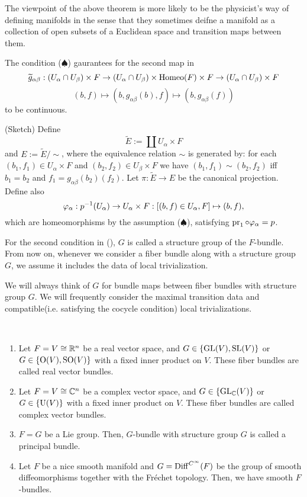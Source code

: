 \documentclass{../../../small}
\begin{document}
The viewpoint of the above theorem is more likely to be the physicist's way of defining manifolds in the sense that they sometimes deifne a manifold as a collection of open subsets of a Euclidean space and transition maps between them.

The condition ($\spadesuit$) gaurantees for the second map in
\[\widetilde g_{\alpha\beta}:(U_\alpha\cap U_\beta)\times F\to(U_\alpha\cap U_\beta)\times\operatorname{Homeo}(F)\times F\to(U_\alpha\cap U_\beta)\times F\]
\[(b,f)\mapsto(b,g_{\alpha\beta}(b),f)\mapsto(b,g_{\alpha\beta}(f))\]
to be continuous.

\begin{pf}(Sketch)
Define
\[\tilde E:=\coprod U_\alpha\times F\]
and $E:=\tilde E/\sim$, where the equivalence relation $\sim$ is generated by: for each $(b_1,f_1)\in U_\alpha\times F$ and $(b_2,f_2)\in U_\beta\times F$ we have $(b_1,f_1)\sim(b_2,f_2)$ iff $b_1=b_2$ and $f_1=g_{\alpha\beta}(b_2)(f_2)$.
Let $\pi:\tilde E\to E$ be the canonical projection.
Define also
\[\varphi_\alpha:p^{-1}(U_\alpha)\to U_\alpha\times F:[(b,f)\in U_\alpha,F]\mapsto (b,f),\] which are homeomorphisms by the assumption ($\spadesuit$), satisfying $\operatorname{pr}_1\circ\varphi_\alpha=p$.
\end{pf}

For the second condition in (\spadesuit), $G$ is called a structure group of the $F$-bundle.
From now on, whenever we consider a fiber bundle along with a structure group $G$, we assume it includes the data of local trivialization.

\begin{rmk*}
We will always think of $G$ for bundle maps between fiber bundles with structure group $G$.
We will frequently consider the maximal transition data and compatible(i.e. satisfying the cocycle condition) local trivializations.
\end{rmk*}
\begin{ex*}\,
\begin{enumerate}
\item Let $F=V\cong\mathbb{R}^n$ be a real vector space, and $G\in\{\mathrm{GL}(V),\mathrm{SL}(V)\}$ or $G\in\{\mathrm{O}(V),\mathrm{SO}(V)\}$ with a fixed inner product on $V$. These fiber bundles are called real vector bundles.
\item Let $F=V\cong\mathbb{C}^n$ be a complex vector space, and $G\in\{\mathrm{GL}_{\mathbb{C}}(V)\}$ or $G\in\{\mathrm{U}(V)\}$ with a fixed inner product on $V$. These fiber bundles are called complex vector bundles.
\item $F=G$ be a Lie group. Then, $G$-bundle with structure group $G$ is called a principal bundle.
\item Let $F$ be a nice smooth manifold and $G=\operatorname{Diff}^{C^\infty}(F)$ be the group of smooth diffeomorphisms together with the Fr\'echet topology. Then, we have smooth $F$-bundles.
\end{enumerate}
\end{ex*}
\end{document}
